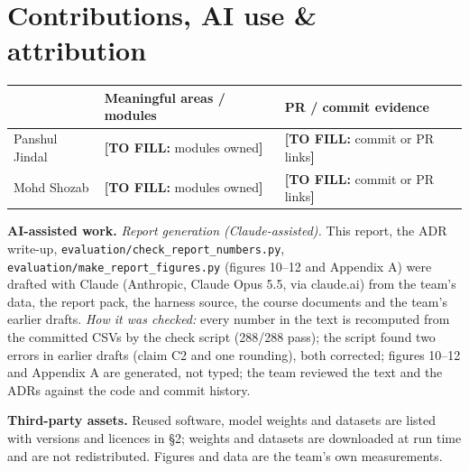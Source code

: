 \documentclass[10pt,a4paper]{article}
\newcommand{\hc}[1]{{\leavevmode\bfseries\color{ink}#1}}   %
\newcommand{\TOFILL}[1]{{\leavevmode\color{pen}\sffamily\footnotesize\textbf{[TO FILL:} #1\textbf{]}}}
\newcommand{\fp}[1]{{\leavevmode\urlstyle{tt}\color{codecol}\nolinkurl{#1}}}
\begin{document}
\section{Contributions, AI use \& attribution}
\begin{table}[H]
\small
{
\begin{tabularx}{\linewidth}{@{}P{2.6cm}LP{4.6cm}@{}}
\toprule
\rowcolor{tblhead}\hc{Member} & \hc{Meaningful areas / modules} & \hc{PR / commit evidence} \\
\midrule
Panshul Jindal & \TOFILL{modules owned} & \TOFILL{commit or PR links} \\
Mohd Shozab & \TOFILL{modules owned} & \TOFILL{commit or PR links} \\
\bottomrule
\end{tabularx}}
\end{table}

\textbf{AI-assisted work.} \emph{Report generation (Claude-assisted).} This report, the ADR write-up,
\fp{evaluation/check_report_numbers.py}, \fp{evaluation/make_report_figures.py} (figures 10--12 and Appendix A) were
drafted with Claude (Anthropic, Claude Opus 5.5, via claude.ai) from the team's data, the report pack, the harness
source, the course documents and the team's earlier drafts. \emph{How it was checked:} every number in the text
is recomputed from the committed CSVs by the check script (288/288 pass); the script found two errors in earlier
drafts (claim C2 and one rounding), both corrected; figures 10--12 and Appendix A are generated, not typed; the team
reviewed the text and the ADRs against the code and commit history.

\textbf{Third-party assets.} Reused software, model weights and datasets are listed with versions and licences in
\S2; weights and datasets are downloaded at run time and are not redistributed. Figures and data are the team's own
measurements.
\end{document}
